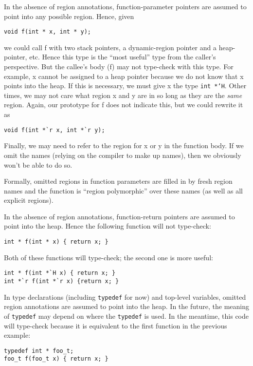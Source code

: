 In the absence of region annotations, function-parameter pointers are
assumed to point into any possible region.  Hence, given
\begin{verbatim}
void f(int * x, int * y);
\end{verbatim}
we could call f with two stack pointers, a dynamic-region pointer and
a heap-pointer, etc.  Hence this type is the ``most useful'' type from
the caller's perspective.  But the callee's body (f) may not
type-check with this type.  For example, x cannot be assigned to a
heap pointer because we do not know that x points into the heap.  If
this is necessary, we must give x the type \texttt{int *`H}.  Other
times, we may not care what region x and y are in so long as they are
the \emph{same} region.  Again, our prototype for f does not indicate
this, but we could rewrite it as
\begin{verbatim}
void f(int *`r x, int *`r y);
\end{verbatim}
Finally, we may need to refer to the region for x or y in the function
body.  If we omit the names (relying on the compiler to make up
names), then we obviously won't be able to do so.

Formally, omitted regions in function parameters are filled in by
fresh region names and the function is ``region polymorphic'' over
these names (as well as all explicit regions).

In the absence of region annotations, function-return pointers are
assumed to point into the heap.  Hence the following function will not
type-check:
\begin{verbatim}
int * f(int * x) { return x; }
\end{verbatim}
Both of these functions will type-check; the second one is more
useful:
\begin{verbatim}
int * f(int *`H x) { return x; }
int *`r f(int *`r x) {return x; }
\end{verbatim}

In type declarations (including \texttt{typedef} for now) and
top-level variables, omitted region annotations are assumed to point
into the heap.  In the future, the meaning of \texttt{typedef} may
depend on where the \texttt{typedef} is used.  In the meantime, this
code will type-check because it is equivalent to the first function in
the previous example:
\begin{verbatim}
typedef int * foo_t;
foo_t f(foo_t x) { return x; }
\end{verbatim}



